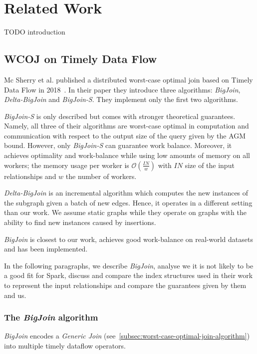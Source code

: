 \section{Related Work} \label{sec:related-work}

TODO introduction
\subsection{\textsc{WCOJ} on Timely Data Flow}\label{subsec:wcoj-timely-data-flow}

Mc Sherry et al. published a distributed worst-case optimal join based on Timely Data Flow in 2018~\cite{ammar2018distributed,naiad}.
In their paper they introduce three algorithms: \textit{BigJoin}, \textit{Delta-BigJoin} and \textit{BigJoin-S}.
They implement only the first two algorithms.

\textit{BigJoin-S} is only described but comes with stronger theoretical guarantees.
Namely, all three of their algorithms are worst-case optimal in computation and communication with respect to the output size of the query
given by the AGM bound.
However, only \textit{BigJoin-S} can guarantee work balance.
Moreover, it achieves optimality and work-balance while using low amounts of memory on all workers;
the memory usage per worker is $\mathcal{O} (\frac{IN}{w})$ with $IN$ size of the input relationships and $w$ the number of workers.

\textit{Delta-BigJoin} is an incremental algorithm which computes the new instances of the subgraph given a batch of new edges.
Hence, it operates in a different setting than our work.
We assume static graphs while they operate on graphs with the ability to find new instances caused by insertions.

\textit{BigJoin} is closest to our work, achieves good work-balance on real-world datasets and has been implemented.

In the following paragraphs, we describe \textit{BigJoin}, analyse we it is not likely to be a good fit for Spark,
discuss and compare the index structures used in their work to represent the input relationships and compare the
guarantees given by them and us.

\subsubsection{The \textit{BigJoin} algorithm}
\textit{BigJoin} encodes a \textit{Generic Join} (see~\cref{subsec:worst-case-optimal-join-algorithm}) into multiple
timely dataflow operators.

